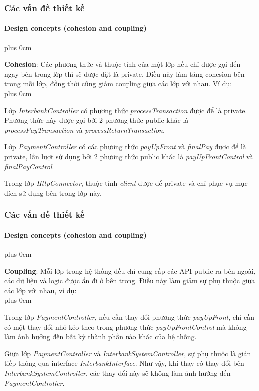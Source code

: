 \documentclass[11pt]{beamer}
\renewcommand{\raggedright}{\leftskip=0pt \rightskip=0pt plus 0cm}
\let\olditemize=\itemize
\renewenvironment{itemize}{\olditemize\raggedright}{\endlist}
\begin{document}
\begin{frame}[plain]
	\frametitle{Các vấn đề thiết kế}
	\framesubtitle{Design concepts (cohesion and coupling)}
	\begin{itemize}
		\item \textbf{Cohesion}: Các phương thức và thuộc tính của một lớp nếu chỉ được gọi đến ngay bên trong lớp thì sẽ được đặt là private. Điều này làm tăng cohesion bên trong mỗi lớp, đồng thời cũng giảm coupling giữa các lớp với nhau. Ví dụ:\\[10pt]
		\begin{itemize}
			\item Lớp \textit{InterbankController} có phương thức \textit{processTransaction} được để là private. Phương thức này được gọi bởi 2 phương thức public khác là \textit{processPayTransaction} và \textit{processReturnTransaction}.\\[5pt]
			\item Lớp \textit{PaymentController} có các phương thức \textit{payUpFront} và \textit{finalPay} được để là private, lần lượt sử dụng bởi 2 phương thức public khác là \textit{payUpFrontControl} và \textit{finalPayControl}.\\[5pt]
			\item Trong lớp \textit{HttpConnector}, thuộc tính \textit{client} được để private và chỉ phục vụ mục đích sử dụng bên trong lớp này.
		\end{itemize}
	\end{itemize}
\end{frame}
\begin{frame}[plain]
	\frametitle{Các vấn đề thiết kế}
	\framesubtitle{Design concepts (cohesion and coupling)}
	\begin{itemize}
		\item \textbf{Coupling}: Mỗi lớp trong hệ thống đều chỉ cung cấp các API public ra bên ngoài, các dữ liệu và logic được ẩn đi ở bên trong. Điều này làm giảm sự phụ thuộc giữa các lớp với nhau, ví dụ:\\[10pt]
		\begin{itemize}
			\item Trong lớp \textit{PaymentController}, nếu cần thay đổi phương thức \textit{payUpFront}, chỉ cần có một thay đổi nhỏ kéo theo trong phương thức \textit{payUpFrontControl} mà không làm ảnh hưởng đến bất kỳ thành phần nào khác của hệ thống.\\[5pt]
			\item Giữa lớp \textit{PaymentController} và \textit{InterbankSystemController}, sự phụ thuộc là gián tiếp thông qua interface \textit{InterbankInterface}. Như vậy, khi thay có thay đổi bên \textit{InterbankSystemController}, các thay đổi này sẽ không làm ảnh hưởng đến \textit{PaymentController}.
		\end{itemize}
	\end{itemize}
\end{frame}
\end{document}

